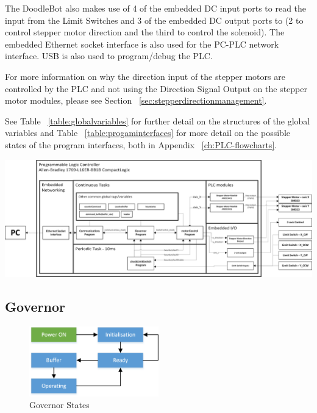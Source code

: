 		The DoodleBot also makes use of 4 of the embedded DC input ports to read the input from the Limit Switches and 3 of the embedded DC output ports to (2 to control stepper motor direction and the third to control the solenoid). The embedded Ethernet socket interface is also used for the PC-PLC network interface. USB is also used to program/debug the PLC. 
		
		For more information on why the direction input of the stepper motors are controlled by the PLC and not using the Direction Signal Output on the stepper motor modules, please see Section ~\ref{sec:stepperdirectionmanagement}.
		
				See Table ~\ref{table:globalvariables} for further detail on the structures of the global variables and Table ~\ref{table:progaminterfaces} for more detail on the possible states of the program interfaces, both in Appendix ~\ref{ch:PLC-flowcharts}.
		

\begin{landscape}
		\vspace*{\fill}
		\includegraphics[width=\hsize]{figures/cncMachine/PLC_architecture}
		\label{fig:PLCarchitecture}
		\vspace*{\fill}
\end{landscape}



	\subsection{Governor}
	
		\begin{figure}[h]
			\centering
			\includegraphics[width=0.5\textwidth]{figures/cncMachine/governor_simple.png}
			\caption{Governor States}
			\label{fig:governor-states}
		\end{figure}
		
